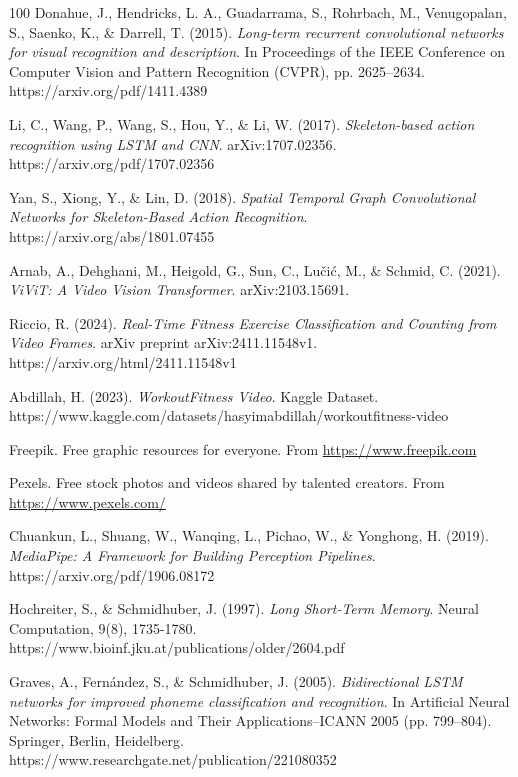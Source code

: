 \documentclass[runningheads]{llncs}
\begin{document}
%
%
%
% 
% 
%
\begin{thebibliography}{100}
Donahue, J., Hendricks, L. A., Guadarrama, S., Rohrbach, M., Venugopalan, S., Saenko, K., \& Darrell, T. (2015). 
\textit{Long-term recurrent convolutional networks for visual recognition and description}. 
In Proceedings of the IEEE Conference on Computer Vision and Pattern Recognition (CVPR), pp. 2625–2634.
https://arxiv.org/pdf/1411.4389

Li, C., Wang, P., Wang, S., Hou, Y., \& Li, W. (2017). 
\textit{Skeleton-based action recognition using LSTM and CNN}. arXiv:1707.02356. 
https://arxiv.org/pdf/1707.02356

Yan, S., Xiong, Y., \& Lin, D. (2018). 
\textit{Spatial Temporal Graph Convolutional Networks for Skeleton-Based Action Recognition}. https://arxiv.org/abs/1801.07455

Arnab, A., Dehghani, M., Heigold, G., Sun, C., Lučić, M., \& Schmid, C. (2021). 
\textit{ViViT: A Video Vision Transformer}. arXiv:2103.15691. 

Riccio, R. (2024). \textit{Real-Time Fitness Exercise Classification and Counting from Video Frames}. arXiv preprint arXiv:2411.11548v1.
https://arxiv.org/html/2411.11548v1

Abdillah, H. (2023). \textit{WorkoutFitness Video}. Kaggle Dataset. https://www.kaggle.com/datasets/hasyimabdillah/workoutfitness-video

Freepik. Free graphic resources for everyone. From \url{https://www.freepik.com}

Pexels. Free stock photos and videos shared by talented creators. From \url{https://www.pexels.com/}


Chuankun, L., Shuang, W., Wanqing, L., Pichao, W., \& Yonghong, H. (2019). 
\textit{MediaPipe: A Framework for Building Perception Pipelines}.
https://arxiv.org/pdf/1906.08172

Hochreiter, S., \& Schmidhuber, J. (1997). 
\textit{Long Short-Term Memory}. Neural Computation, 9(8), 1735-1780. https://www.bioinf.jku.at/publications/older/2604.pdf

Graves, A., Fernández, S., \& Schmidhuber, J. (2005). 
\textit{Bidirectional LSTM networks for improved phoneme classification and recognition}. In Artificial Neural Networks: Formal Models and Their Applications–ICANN 2005 (pp. 799–804). Springer, Berlin, Heidelberg.
https://www.researchgate.net/publication/221080352


\end{thebibliography}
\end{document}
